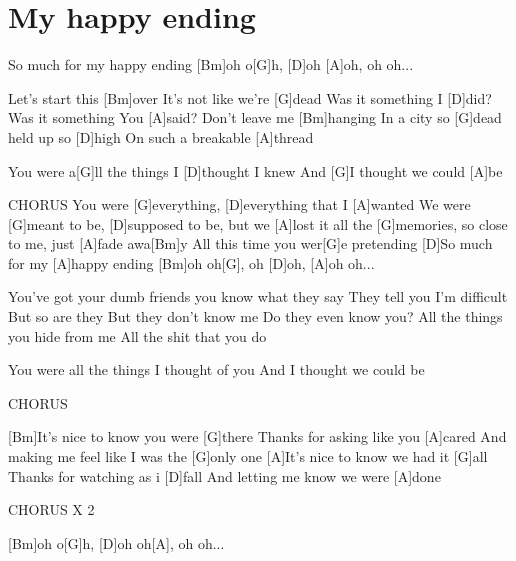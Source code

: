 \section{My happy ending}
\begin{multicols}{2}
\begin{guitar}
So much for my happy ending
[Bm]oh o[G]h, [D]oh [A]oh, oh oh... 

Let's start this [Bm]over
It's not like we're [G]dead
Was it something I [D]did?
Was it something You [A]said?
Don't leave me [Bm]hanging
In a city so [G]dead
held up so [D]high
On such a breakable [A]thread
 

You were a[G]ll the things I [D]thought I knew
And [G]I thought we could [A]be 


CHORUS
You were [G]everything, [D]everything that I [A]wanted 
We were [G]meant to be, [D]supposed to be, but we [A]lost it
all the [G]memories, so close to me, just [A]fade awa[Bm]y
All this time you wer[G]e pretending
[D]So much for my [A]happy ending
[Bm]oh oh[G], oh [D]oh, [A]oh oh... 


You've got your dumb friends 
you know what they say
They tell you I'm difficult 
But so are they
But they don't know me
Do they even know you?
All the things you hide from me
All the shit that you do 


You were all the things I thought of you 
And I thought we could be 

CHORUS 


[Bm]It's nice to know you were [G]there
Thanks for asking like you [A]cared
And making me feel like I was the [G]only one
[A]It's nice to know we had it [G]all
Thanks for watching as i [D]fall
And letting me know we were [A]done  


CHORUS X 2 


[Bm]oh o[G]h, [D]oh oh[A], oh oh...
\end{guitar}
\end{multicols}
